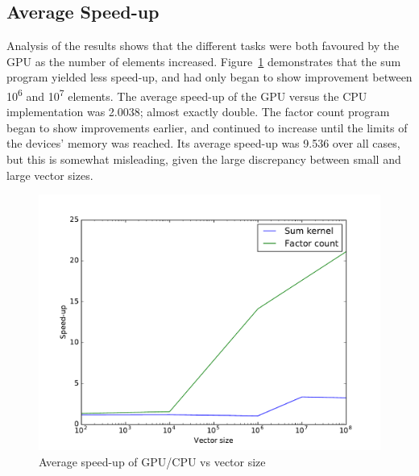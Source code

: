 \begin{table}[h]
\centering
{}
\caption{CPU vs GPU performance counting factors}
\label{tab:factors}

\end{table}


\subsection{Average Speed-up}
Analysis of the results shows that the different tasks were both favoured by the GPU as the number of elements increased. Figure~\ref{fig:speedup} demonstrates that the sum program yielded less speed-up, and had only began to show improvement between 10\textsuperscript{6} and 10\textsuperscript{7} elements. The average speed-up of the GPU versus the CPU implementation was 2.0038; almost exactly double. The factor count program began to show improvements earlier, and continued to increase until the limits of the devices' memory was reached. Its average speed-up was 9.536 over all cases, but this is somewhat misleading, given the large discrepancy between small and large vector sizes.


\begin{figure}[h]
\centering
\includegraphics[width=\columnwidth]{Figures/speedup}
\caption{Average speed-up of GPU/CPU vs vector size}
\label{fig:speedup}
\end{figure}


